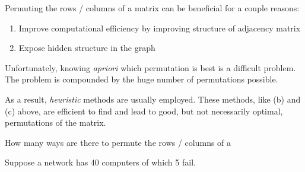 \documentclass[]{exam}
\begin{document}
\begin{questions}
    Permuting the rows / columns of a matrix can be beneficial for a couple
    reasons:

      \begin{enumerate}
        \item Improve computational efficiency by improving structure of
          adjacency matrix
        \item Expose hidden structure in the graph
      \end{enumerate}

    Unfortunately, knowing \emph{apriori} which permutation is best is a
    difficult problem. The problem is compounded by the huge number of
    permutations possible.

    As a result, \emph{heuristic} methods are usually employed. These methods,
    like (b) and (c) above, are efficient to find and lead to good, but not
    necessarily optimal, permutations of the matrix.

    \bigskip

    \question How many ways are there to permute the rows / columns of a


    \question Suppose a network has 40 computers of which 5 fail.
\end{questions}
\end{document}

